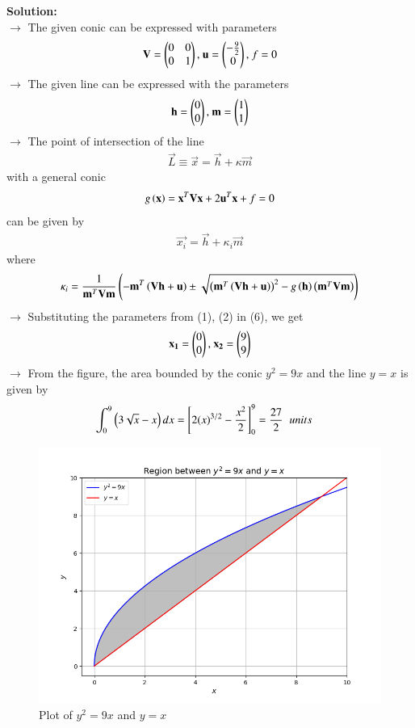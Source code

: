 \documentclass[journal]{IEEEtran}
\begin{document}
\textbf{Solution:}\\
$\rightarrow$ The given conic can be expressed with parameters
\begin{align}
    \mathbf{V} = \begin{pmatrix}0&0\\0&1\end{pmatrix}\text{, } \mathbf{u} = \begin{pmatrix}-\frac{9}{2}\\0\end{pmatrix}\text{, } f = 0
\end{align}
$\rightarrow$ The given line can be expressed with the parameters
\begin{align}
    \mathbf{h} = \begin{pmatrix}0\\0\end{pmatrix}\text{, } \mathbf{m} = \begin{pmatrix}1\\1\end{pmatrix}
\end{align}
$\rightarrow$ The point of intersection of the line
\begin{align}
    \vec{L} \equiv \vec{x} = \vec{h} + \kappa\vec{m}
\end{align}
\hspace{0.3cm} with a general conic
\begin{align}
    g\left(\mathbf{x}\right) = \mathbf{x}^T\mathbf{V}\mathbf{x} + 2\mathbf{u}^T\mathbf{x} + f = 0
\end{align}
\hspace{0.3cm} can be given by
\begin{align}
    \vec{x_i} = \vec{h} + \kappa_i\vec{m}
\end{align}
\hspace{0.3cm} where
\begin{align}
    \kappa_i = \frac{1}{\mathbf{m}^T\mathbf{V}\mathbf{m}}\left(-\mathbf{m}^T\left(\mathbf{V}\mathbf{h}+\mathbf{u}\right)\pm \sqrt{\left(\mathbf{m}^T\left(\mathbf{V}\mathbf{h}+\mathbf{u}\right)\right)^2-g\left(\mathbf{h}\right)\left(\mathbf{m}^T\mathbf{V}\mathbf{m}\right)}\right)
\end{align}
$\rightarrow$ Substituting the parameters from (1), (2) in (6), we get
\begin{align}
    \mathbf{x_1} = \begin{pmatrix}0\\0\end{pmatrix}\text{, } \mathbf{x_2} = \begin{pmatrix}9\\9\end{pmatrix}
\end{align}
$\rightarrow$ From the figure, the area bounded by the conic $y^2 = 9x$ and the line $y = x$ is given by
\begin{align}
    \int_{0}^{9}\left(3\sqrt{x} - x\right)dx &= \left[2(x)^{3/2} - \frac{x^2}{2}\right]_{0}^{9} = \frac{27}{2}\hspace{0.2cm}units
\end{align}
\begin{figure}[h!]
   \centering
   \includegraphics[width=0.7\linewidth]{figs/01.png}
   \caption{Plot of $y^2 = 9x$ and $y = x$}
   \label{Plot_1}
\end{figure}
\end{document}
